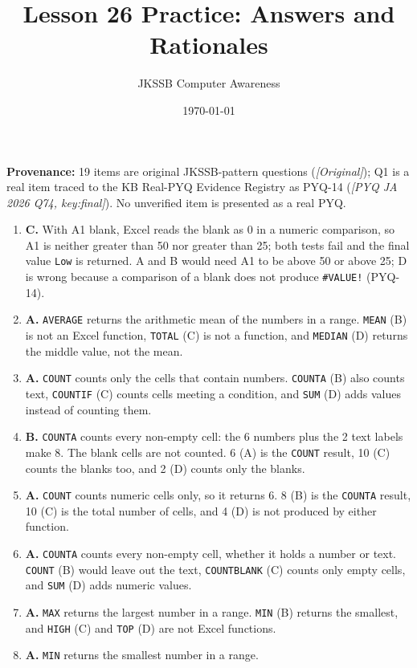 \documentclass[11pt]{article}
\title{Lesson 26 Practice: Answers and Rationales}
\author{JKSSB Computer Awareness}
\date{\today}
\begin{document}
\maketitle
\noindent\textbf{Provenance:} 19 items are original JKSSB-pattern questions
(\textit{[Original]}); Q1 is a real item traced to the KB Real-PYQ Evidence
Registry as PYQ-14 (\textit{[PYQ JA 2026 Q74, key:final]}). No unverified item
is presented as a real PYQ.
\begin{enumerate}[label=\textbf{Q\arabic*.}, leftmargin=*]
\item \textbf{C.} With A1 blank, Excel reads the blank as 0 in a numeric
  comparison, so A1 is neither greater than 50 nor greater than 25; both tests
  fail and the final value \texttt{Low} is returned. A and B would need A1 to
  be above 50 or above 25; D is wrong because a comparison of a blank does not
  produce \texttt{\#VALUE!} (PYQ-14).
\item \textbf{A.} \texttt{AVERAGE} returns the arithmetic mean of the numbers
  in a range. \texttt{MEAN} (B) is not an Excel function, \texttt{TOTAL} (C)
  is not a function, and \texttt{MEDIAN} (D) returns the middle value, not the
  mean.
\item \textbf{A.} \texttt{COUNT} counts only the cells that contain numbers.
  \texttt{COUNTA} (B) also counts text, \texttt{COUNTIF} (C) counts cells
  meeting a condition, and \texttt{SUM} (D) adds values instead of counting
  them.
\item \textbf{B.} \texttt{COUNTA} counts every non-empty cell: the 6 numbers
  plus the 2 text labels make 8. The blank cells are not counted. 6 (A) is the
  \texttt{COUNT} result, 10 (C) counts the blanks too, and 2 (D) counts only
  the blanks.
\item \textbf{A.} \texttt{COUNT} counts numeric cells only, so it returns 6.
  8 (B) is the \texttt{COUNTA} result, 10 (C) is the total number of cells,
  and 4 (D) is not produced by either function.
\item \textbf{A.} \texttt{COUNTA} counts every non-empty cell, whether it
  holds a number or text. \texttt{COUNT} (B) would leave out the text,
  \texttt{COUNTBLANK} (C) counts only empty cells, and \texttt{SUM} (D) adds
  numeric values.
\item \textbf{A.} \texttt{MAX} returns the largest number in a range.
  \texttt{MIN} (B) returns the smallest, and \texttt{HIGH} (C) and
  \texttt{TOP} (D) are not Excel functions.
\item \textbf{A.} \texttt{MIN} returns the smallest number in a range.

\end{enumerate}
\end{document}
